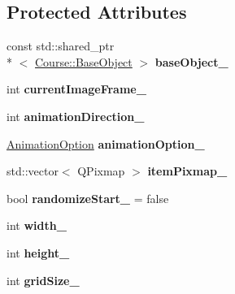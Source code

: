 \subsection*{Protected Attributes}
\begin{DoxyCompactItemize}
\item 
\hypertarget{class_student_1_1_scene_item_aa43fd9928e92d9ec8232642f2dac941f}{const std\-::shared\-\_\-ptr\\*
$<$ \hyperlink{class_course_1_1_base_object}{Course\-::\-Base\-Object} $>$ {\bfseries base\-Object\-\_\-}}\label{class_student_1_1_scene_item_aa43fd9928e92d9ec8232642f2dac941f}

\item 
\hypertarget{class_student_1_1_scene_item_a5eef34f9961051e6123639a6e95bf685}{int {\bfseries current\-Image\-Frame\-\_\-}}\label{class_student_1_1_scene_item_a5eef34f9961051e6123639a6e95bf685}

\item 
\hypertarget{class_student_1_1_scene_item_a720976afecf0ab96b9f946e2a80e72be}{int {\bfseries animation\-Direction\-\_\-}}\label{class_student_1_1_scene_item_a720976afecf0ab96b9f946e2a80e72be}

\item 
\hypertarget{class_student_1_1_scene_item_ab261e365814e698aa8c36651acb47cf6}{\hyperlink{class_student_1_1_animation_option}{Animation\-Option} {\bfseries animation\-Option\-\_\-}}\label{class_student_1_1_scene_item_ab261e365814e698aa8c36651acb47cf6}

\item 
\hypertarget{class_student_1_1_scene_item_a237d8eab60e3d344a8cc03ced51181c5}{std\-::vector$<$ Q\-Pixmap $>$ {\bfseries item\-Pixmap\-\_\-}}\label{class_student_1_1_scene_item_a237d8eab60e3d344a8cc03ced51181c5}

\item 
\hypertarget{class_student_1_1_scene_item_ae314005d9bbf12933551ad15d507ff43}{bool {\bfseries randomize\-Start\-\_\-} = false}\label{class_student_1_1_scene_item_ae314005d9bbf12933551ad15d507ff43}

\item 
\hypertarget{class_student_1_1_scene_item_add27328b198c6720dd37fb41f7665645}{int {\bfseries width\-\_\-}}\label{class_student_1_1_scene_item_add27328b198c6720dd37fb41f7665645}

\item 
\hypertarget{class_student_1_1_scene_item_aeff7984d94daff7b604f4dfc80195e31}{int {\bfseries height\-\_\-}}\label{class_student_1_1_scene_item_aeff7984d94daff7b604f4dfc80195e31}

\item 
\hypertarget{class_student_1_1_scene_item_a56c9acd15ff63812b9ea56a7847470f1}{int {\bfseries grid\-Size\-\_\-}}\label{class_student_1_1_scene_item_a56c9acd15ff63812b9ea56a7847470f1}

\end{DoxyCompactItemize}



